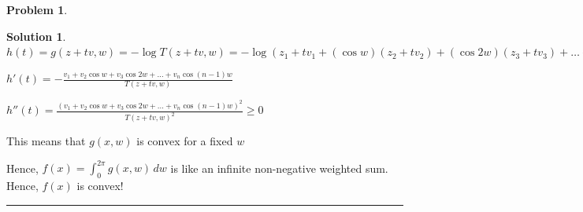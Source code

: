 \documentclass{article}
\theoremstyle{definition}
\newtheorem{problem}{Problem}
\def\fline{\rule{0.75\linewidth}{0.5pt}}
\newcommand{\finishline}{\begin{center}\fline\end{center}}
\newtheorem*{solution*}{Solution}
\newenvironment{solution}{\begin{solution*}}{{\finishline} \end{solution*}}
\begin{document}
\begin{problem}
\begin{itemize}
\begin{solution}
    $h(t) = g(z + tv, w) = - \log T(z + tv, w) = - \log(z_1 + tv_1 + (\cos{w})(z_2 + tv_2) +  (\cos{2w}) (z_3 + tv_3) + \dots + (\cos{(n - 1)w}) (z_n + tv_n))$ \newline 

    $h'(t) = - \frac{v_1 + v_2 \cos{w} + v_3 \cos{2w} + \dots + v_n \cos{(n - 1)w} }{T(z + tv, w)}$ \newline 

    $h''(t) = \frac{(v_1 + v_2 \cos{w} + v_3 \cos{2w} + \dots + v_n \cos{(n - 1)w} )^2}{T(z + tv, w)^2} \geq 0$

    This means that $g(x, w)$ is convex for a fixed $w$ \newline 

    Hence, $f(x) = \int_{0}^{2\pi} g(x, w) \,dw$ is like an infinite non-negative weighted sum. Hence, $f(x)$ is convex!
    

\end{solution}
    \end{itemize}
\end{problem}
\end{document}
